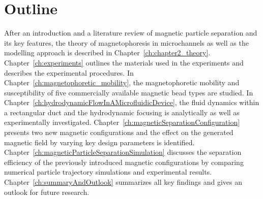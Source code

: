 \section{Outline}

After an introduction and a literature review of magnetic particle separation and its key features, the theory of magnetophoresis in microchannels as well as the modelling approach is described in Chapter~\ref{ch:chapter2_theory}. Chapter~\ref{ch:experiments} outlines the materials used in the experiments and describes the experimental procedures. In Chapter~\ref{ch:magnetophoretic_mobility}, the magnetophoretic mobility and susceptibility of five commercially available magnetic bead types are studied. In Chapter~\ref{ch:hydrodynamicFlowInAMicrofluidicDevice}, the fluid dynamics within a rectangular duct and the hydrodynamic focusing is analytically as well as experimentally investigated. Chapter~\ref{ch:magneticSeparationConfiguration} presents two new magnetic configurations and the effect on the generated magnetic field by varying key design parameters is identified. Chapter~\ref{ch:magneticParticleSeparationSimulation} discusses the separation efficiency of the previously introduced magnetic configurations by comparing numerical particle trajectory simulations and experimental results. Chapter~\ref{ch:summaryAndOutlook} summarizes all key findings and gives an outlook for future research. 

